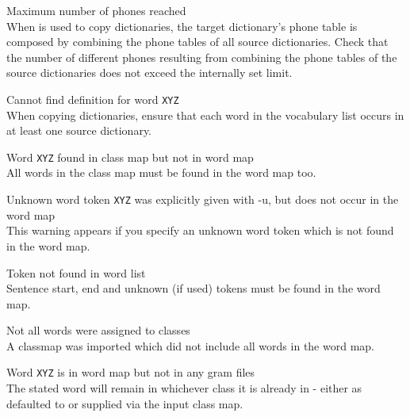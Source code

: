 \begin{itemize}
\begin{itemize}
 Maximum number of phones reached\\
        When  is used to copy dictionaries, the target dictionary's
        phone table is composed by combining the phone tables of all source
        dictionaries. Check that the number of different phones resulting from
        combining the phone tables of the source dictionaries does not exceed the
        internally set limit.

 Cannot find definition for word {\tt XYZ}\\
        When copying dictionaries, ensure that each word in the vocabulary list
        occurs in at least one source dictionary.
\end{itemize}



\begin{itemize}
 Word {\tt XYZ} found in class map but not in word map\\
        All words in the class map must be found in the word map too.

 Unknown word token {\tt XYZ} was explicitly given with -u, but
          does not occur in the word map\\
        This warning appears if you specify an unknown word token
          which is not found in the word map.

 Token not found in word list\\
        Sentence start, end and unknown (if used) tokens must be found
        in the word map.

 Not all words were assigned to classes\\
        A classmap was imported which did not include all words in the
        word map.

 Word {\tt XYZ} is in word map but not in any gram files\\
        The stated word will remain in whichever class it is already
        in - either as defaulted to or supplied via the input class map.
\end{itemize}


\end{itemize}



